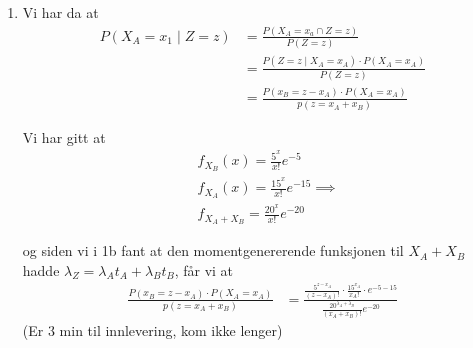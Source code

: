 \documentclass[a4paper,11pt,norsk]{article}
\begin{document}
\begin{enumerate}
{        Siden vi her kan skrive om den momentgenererende funksjonen til Z på formen av en 
        poissonfordeling, må Z være poissonfordelt.
    }
    \item {
        Vi har da at 
        \begin{align*}
            P(X_A = x_1 \mid Z = z) &= \frac{P(X_A = x_a \cap Z = z)}{P(Z = z)} \\ 
                                    &= \frac{P(Z = z \mid X_A = x_A) \cdot P(X_A = x_A)}{P(Z = z)} \\ 
                                    &= \frac{P(x_B = z - x_A) \cdot P(X_A = x_A)}{p(z = x_A + x_B)}
        \end{align*}

        Vi har gitt at 
        \begin{align*}
            &f_{X_B}(x) = \frac{5^x}{x!}e^{-5} \\ 
            &f_{X_A}(x) = \frac{15^x}{x!}e^{-15} \implies \\ 
            &f_{X_A + X_B} = \frac{20^x}{x!}e^{-20}
        \end{align*}

        og siden vi i 1b fant at den momentgenererende funksjonen til $X_A + X_B$ hadde 
        $\lambda_Z = \lambda_A t_A + \lambda_B t_B$, får vi at
        \begin{align*}
            \frac{P(x_B = z - x_A) \cdot P(X_A = x_A)}{p(z = x_A + x_B)} &= \frac{\frac{5^{z-x_A}}{(z-x_A)!} \cdot \frac{15^{x_A}}{x_A!} \cdot e^{-5-15}}{\frac{20^{\lambda_A + \lambda_B}}{(x_A + x_B)!}e^{-20}}
        \end{align*}
        (Er 3 min til innlevering, kom ikke lenger)
    }
\end{enumerate}
\end{document}
